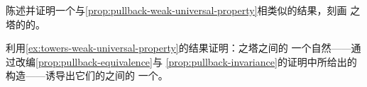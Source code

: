 \begin{exercise}\label{ex:towers-weak-universal-property}
陈述并证明一个与\cref{prop:pullback-weak-universal-property}相类似的结果，刻画%
\trIsofibration{}之塔的\trLimit{}的\trBicategory\trUniversalProperty。
\end{exercise}

\begin{exercise}\label{ex:towers-limits-equivalence}
利用\cref{ex:towers-weak-universal-property}的结果证明：\trIsofibration{}之塔之间的%
一个自然\trEquivalence{}——通过改编\cref{prop:pullback-equivalence}与%
\cref{prop:pullback-invariance}的证明中所给出的构造——诱导出它们的\trLimit{}之间的%
一个\trEquivalence。
\end{exercise}
